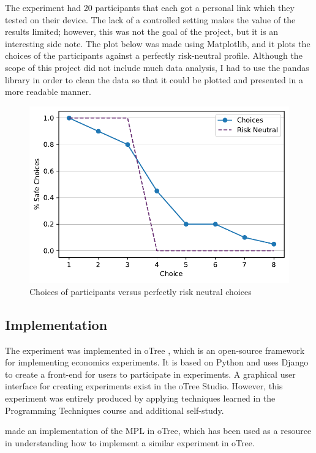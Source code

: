 \documentclass [12pt,a4paper,oneside]{article}
\begin{document}
The experiment had 20 participants that each got a personal link which they tested on their device. The lack of a controlled setting makes the value of the results limited; however, this was not the goal of the project, but it is an interesting side note. The plot below was made using Matplotlib, and it plots the choices of the participants against a perfectly risk-neutral profile. Although the scope of this project did not include much data analysis, I had to use the pandas library in order to clean the data so that it could be plotted and presented in a more readable manner. 

\begin{figure}[H]
  \centering
  \includegraphics{graphics/aggregate_plot.pdf}
  \caption{Choices of participants versus perfectly risk neutral choices}
  \label{fig:choices}
\end{figure}

\subsection{Implementation}\label{sec:implementation}
The experiment was implemented in oTree \parencite{chen_otreeopen-source_2016}, which is an open-source framework for implementing economics experiments. It is based on Python and uses Django to create a front-end for users to participate in experiments. A graphical user interface for creating experiments exist in the oTree Studio. However, this experiment was entirely produced by applying techniques learned in the Programming Techniques course and additional self-study.

\textcite{holzmeister_otree_2017} made an implementation of the \cite{holt_risk_2002} MPL in oTree, which has been used as a resource in understanding how to implement a similar experiment in oTree. 
\end{document}
